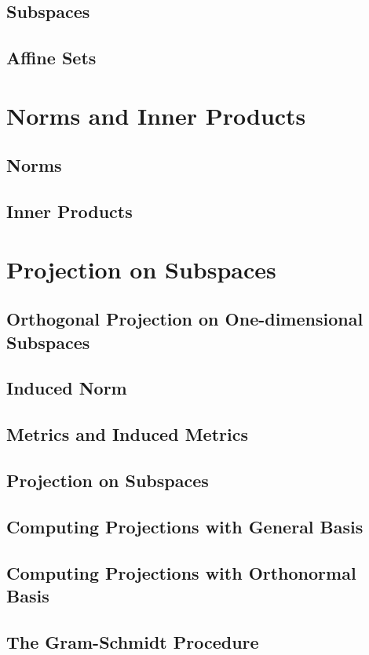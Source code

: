 \documentclass[10pt]{article}
\begin{document}
\subsection{Subspaces}
\subsection{Affine Sets}

\section{Norms and Inner Products}
\subsection{Norms}
\subsection{Inner Products}

\section{Projection on Subspaces}
\subsection{Orthogonal Projection on One-dimensional Subspaces}
\subsection{Induced Norm}
\subsection{Metrics and Induced Metrics}
\subsection{Projection on Subspaces}
\subsection{Computing Projections with General Basis}
\subsection{Computing Projections with Orthonormal Basis}
\subsection{The Gram-Schmidt Procedure}
\end{document}
